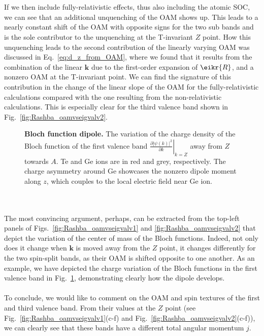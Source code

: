 \\\\
If we then include fully-relativistic effects, thus also including the atomic SOC, we can see that an additional unquenching of the OAM shows up.
This leads to a nearly constant shift of the OAM with opposite signs for the two sub bands and is the sole contributor to the unquenching at the T-invariant $Z$ point.
How this unquenching leads to the second contribution of the linearly varying OAM was discussed in Eq.~\eqref{eq:d_z_from_OAM}, where we found that it results from the combination of the linear $\bm k$ due to the first-order expansion of $\eikr{R}$, and a nonzero OAM at the T-invariant point.
We can find the signature of this contribution in the change of the linear slope of the OAM for the fully-relativistic calculations compared with the one resulting from the non-relativistic calculations.
This is especially clear for the third valence band shown in Fig.~\ref{fig:Rashba_oamvseigvalv2}.
\begin{figure}
	\centering
{}
\caption{\label{fig:Rashba_diffdens}{\bf Bloch function dipole.} The variation of the charge density of the Bloch function of the first valence band $\left.\frac{\partial |\psi(k)|^2}{\partial k}\right\rvert_{k=Z}$ away from $Z$ towards $A$. Te and Ge ions are in red and grey, respectively. The charge asymmetry around Ge showcases the nonzero dipole moment along $z$, which couples to the local electric field near Ge ion.}
\end{figure}
\\\\
The most convincing argument, perhaps, can be extracted from the top-left panels of Figs.~\ref{fig:Rashba_oamvseigvalv1} and \ref{fig:Rashba_oamvseigvalv2} that depict the variation of the center of mass of the Bloch functions. Indeed, not only does it change when $\bm k$ is moved away from the $Z$ point, it changes differently for the two spin-split bands, as their OAM is shifted opposite to one another.
As an example,  we have depicted the charge variation of the Bloch functions in the first valence band in Fig.~\ref{fig:Rashba_diffdens}, demonstrating clearly how the dipole develops.
\\\\
To conclude, we would like to comment on the OAM and spin textures of the first and third valence band.
From their values at the $Z$ point (see Fig.~\ref{fig:Rashba_oamvseigvalv1}(c-f) and Fig.~\ref{fig:Rashba_oamvseigvalv2}(c-f)), we can clearly see that these bands have a different total angular momentum $j$.

